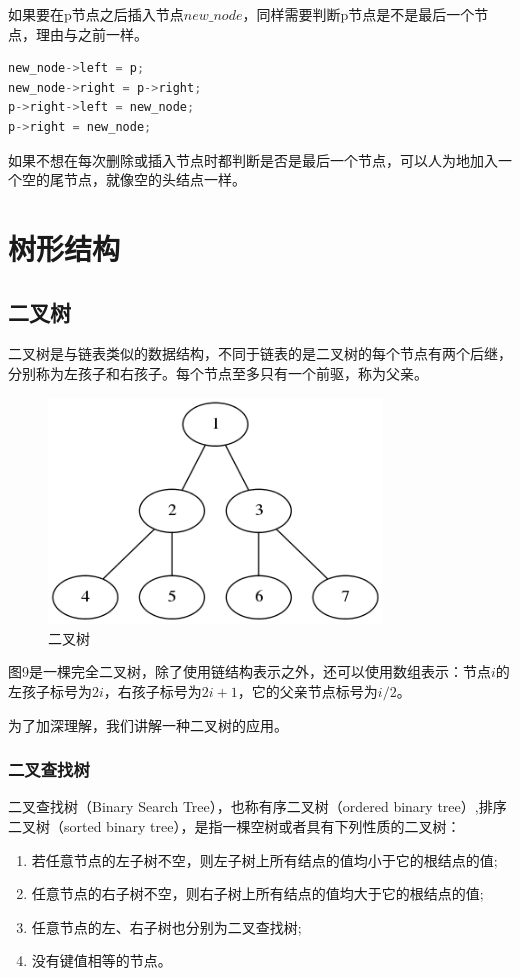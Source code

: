 \documentclass[a4paper]{article}
\begin{document}
\begin{CJK}{UTF8}{gbsn}
如果要在p节点之后插入节点$new\_node$，同样需要判断p节点是不是最后一个节点，理由与之前一样。
\begin{lstlisting}[language=C++]
new_node->left = p;
new_node->right = p->right;
p->right->left = new_node;
p->right = new_node;
\end{lstlisting}
如果不想在每次删除或插入节点时都判断是否是最后一个节点，可以人为地加入一个空的尾节点，就像空的头结点一样。

\section{树形结构}

\subsection{二叉树}

二叉树是与链表类似的数据结构，不同于链表的是二叉树的每个节点有两个后继，分别称为左孩子和右孩子。每个节点至多只有一个前驱，称为父亲。

\begin{figure}[htbp]
\centering\includegraphics[height=6cm]{bt1.png}
\caption{二叉树}
\end{figure}

图9是一棵完全二叉树，除了使用链结构表示之外，还可以使用数组表示：节点$i$的左孩子标号为$2i$，右孩子标号为$2i+1$，它的父亲节点标号为$i/2$。

为了加深理解，我们讲解一种二叉树的应用。

\subsubsection*{二叉查找树}
二叉查找树（Binary Search Tree），也称有序二叉树（ordered binary tree）,排序二叉树（sorted binary tree），是指一棵空树或者具有下列性质的二叉树：
\begin{enumerate}
\item 若任意节点的左子树不空，则左子树上所有结点的值均小于它的根结点的值;
\item 任意节点的右子树不空，则右子树上所有结点的值均大于它的根结点的值;
\item 任意节点的左、右子树也分别为二叉查找树;
\item 没有键值相等的节点。
\end{enumerate}


\end{CJK}
\end{document}

